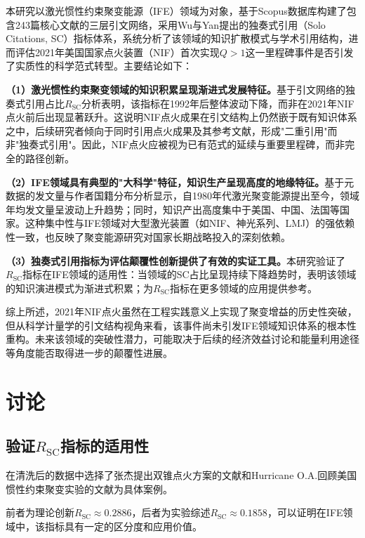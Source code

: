 \documentclass[12pt,hyperref,a4paper,UTF8]{ctexart}
\begin{document}
    本研究以激光惯性约束聚变能源（IFE）领域为对象，基于Scopus数据库构建了包含243篇核心文献的三层引文网络，采用Wu与Yan提出的独奏式引用（Solo Citations, SC）指标体系，系统分析了该领域的知识扩散模式与学术引用结构，进而评估2021年美国国家点火装置（NIF）首次实现$Q>1$这一里程碑事件是否引发了实质性的科学范式转型。主要结论如下：

    \textbf{（1）激光惯性约束聚变领域的知识积累呈现渐进式发展特征。}基于引文网络的独奏式引用占比$R_{\mathrm{SC}}$分析表明，该指标在1992年后整体波动下降，而非在2021年NIF点火前后出现显著跃升。这说明NIF点火成果在引文结构上仍然嵌于既有知识体系之中，后续研究者倾向于同时引用点火成果及其参考文献，形成"二重引用"而非"独奏式引用"。因此，NIF点火应被视为已有范式的延续与重要里程碑，而非完全的路径创新。

    \textbf{（2）IFE领域具有典型的"大科学"特征，知识生产呈现高度的地缘特征。}基于元数据的发文量与作者国籍分布分析显示，自1980年代激光聚变能源提出至今，领域年均发文量呈波动上升趋势；同时，知识产出高度集中于美国、中国、法国等国家。这种集中性与IFE领域对大型激光装置（如NIF、神光系列、LMJ）的强依赖性一致，也反映了聚变能源研究对国家长期战略投入的深刻依赖。

    \textbf{（3）独奏式引用指标为评估颠覆性创新提供了有效的实证工具。}本研究验证了$R_{\mathrm{SC}}$指标在IFE领域的适用性：当领域的SC占比呈现持续下降趋势时，表明该领域的知识演进模式为渐进式积累；为$R_{\mathrm{SC}}$指标在更多领域的应用提供参考。

    综上所述，2021年NIF点火虽然在工程实践意义上实现了聚变增益的历史性突破，但从科学计量学的引文结构视角来看，该事件尚未引发IFE领域知识体系的根本性重构。未来该领域的突破性潜力，可能取决于后续的经济效益讨论和能量利用途径等角度能否取得进一步的颠覆性进展。



\section{讨论}
    \subsection{验证$R_{\mathrm{SC}}$指标的适用性}
    在清洗后的数据中选择了张杰提出双锥点火方案的文献\cite{zhang2020doublecone}和Hurricane O.A.回顾美国惯性约束聚变实验的文献\cite{hurricane2023physics}为具体案例。
    
    前者为理论创新$R_{\mathrm{SC}}\approx0.2886$，后者为实验综述$R_{\mathrm{SC}}\approx0.1858$，可以证明在IFE领域中，该指标具有一定的区分度和应用价值。
\end{document}
